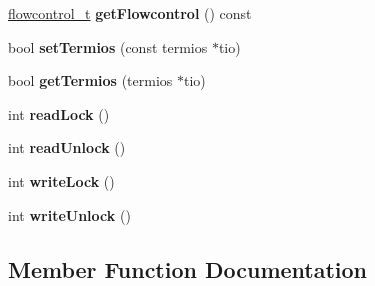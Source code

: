 \begin{DoxyCompactItemize}
\item 
\hyperlink{namespaceserial_a93ef57a314b4e562f9eded6c15d34351}{flowcontrol\+\_\+t} {\bfseries get\+Flowcontrol} () const \hypertarget{classserial_1_1serial_1_1_serial_1_1_serial_impl_ada9392d462e7f1b922e1f2ea7c2bd881}{}\label{classserial_1_1serial_1_1_serial_1_1_serial_impl_ada9392d462e7f1b922e1f2ea7c2bd881}

\item 
bool {\bfseries set\+Termios} (const termios $\ast$tio)\hypertarget{classserial_1_1serial_1_1_serial_1_1_serial_impl_a94df4cb3ea8b58d124554637b3cc98d6}{}\label{classserial_1_1serial_1_1_serial_1_1_serial_impl_a94df4cb3ea8b58d124554637b3cc98d6}

\item 
bool {\bfseries get\+Termios} (termios $\ast$tio)\hypertarget{classserial_1_1serial_1_1_serial_1_1_serial_impl_a07e74d9a01c0a9ebb54c214fb3453856}{}\label{classserial_1_1serial_1_1_serial_1_1_serial_impl_a07e74d9a01c0a9ebb54c214fb3453856}

\item 
int {\bfseries read\+Lock} ()\hypertarget{classserial_1_1serial_1_1_serial_1_1_serial_impl_a1a63f1071f960e512b7f83824cc46bc7}{}\label{classserial_1_1serial_1_1_serial_1_1_serial_impl_a1a63f1071f960e512b7f83824cc46bc7}

\item 
int {\bfseries read\+Unlock} ()\hypertarget{classserial_1_1serial_1_1_serial_1_1_serial_impl_aa91835c9873bbba6a3693848ec10bd63}{}\label{classserial_1_1serial_1_1_serial_1_1_serial_impl_aa91835c9873bbba6a3693848ec10bd63}

\item 
int {\bfseries write\+Lock} ()\hypertarget{classserial_1_1serial_1_1_serial_1_1_serial_impl_a6dd6c072c2022087816e36edae1bd874}{}\label{classserial_1_1serial_1_1_serial_1_1_serial_impl_a6dd6c072c2022087816e36edae1bd874}

\item 
int {\bfseries write\+Unlock} ()\hypertarget{classserial_1_1serial_1_1_serial_1_1_serial_impl_a8061d98e76fae5b808d2dc86b972ce1a}{}\label{classserial_1_1serial_1_1_serial_1_1_serial_impl_a8061d98e76fae5b808d2dc86b972ce1a}

\end{DoxyCompactItemize}


\subsection{Member Function Documentation}

